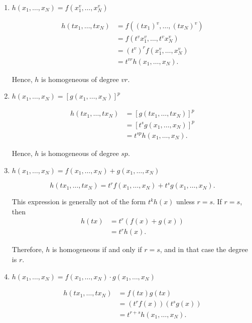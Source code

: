 \begin{enumerate}
    \item[(i)] $h(x_1,\dots,x_N)=f(x_1^v,\dots,x_N^v)$

    \[
\begin{aligned}
    h(tx_1,\dots,tx_N)
    &= f((tx_1)^v,\dots,(tx_N)^v)\\
    &= f(t^v x_1^v,\dots,t^v x_N^v)\\
    &= (t^v)^r f(x_1^v,\dots,x_N^v)\\
    &= t^{vr} h(x_1,\dots,x_N).
\end{aligned}
    \]

    Hence, $h$ is homogeneous of degree $\boxed{vr}$.

    \item[(ii)] $h(x_1,\dots,x_N)=[g(x_1,\dots,x_N)]^p$

    \[
\begin{aligned}
    h(tx_1,\dots,tx_N)
    &= [g(tx_1,\dots,tx_N)]^p\\
    &= [t^s g(x_1,\dots,x_N)]^p\\
    &= t^{sp} h(x_1,\dots,x_N).
\end{aligned}
    \]

    Hence, $h$ is homogeneous of degree $\boxed{sp}$.

    \item[(iii)] $h(x_1,\dots,x_N)=f(x_1,\dots,x_N)+g(x_1,\dots,x_N)$

    \[
    h(tx_1,\dots,tx_N)
    = t^r f(x_1,\dots,x_N) + t^s g(x_1,\dots,x_N).
    \]

    This expression is generally not of the form $t^k h(x)$ unless $r=s$.  
    If $r=s$, then
    \[
    \begin{aligned}
    h(tx)
    &=t^r(f(x)+g(x))\\
    &=t^r h(x).
    \end{aligned}
    \]

    Therefore, $h$ is homogeneous if and only if $r=s$, and in that case the degree is $\boxed{r}$.

    \item[(iv)] $h(x_1,\dots,x_N)=f(x_1,\dots,x_N)\cdot g(x_1,\dots,x_N)$

    \[
\begin{aligned}
    h(tx_1,\dots,tx_N)
    &= f(tx)g(tx)\\
    &= (t^r f(x))(t^s g(x))\\
    &= t^{r+s} h(x_1,\dots,x_N).
\end{aligned}
    \]


\end{enumerate}

